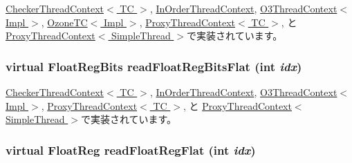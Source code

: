 \hyperlink{classCheckerThreadContext_a4998e6615f835676762af364eff198e3}{CheckerThreadContext$<$ TC $>$}, \hyperlink{classInOrderThreadContext_a4998e6615f835676762af364eff198e3}{InOrderThreadContext}, \hyperlink{classO3ThreadContext_a16de1015632e110ed029afa05ffd799d}{O3ThreadContext$<$ Impl $>$}, \hyperlink{classOzoneCPU_1_1OzoneTC_a0d251dc1da1814673c7548cf46caf6ca}{OzoneTC$<$ Impl $>$}, \hyperlink{classProxyThreadContext_a4998e6615f835676762af364eff198e3}{ProxyThreadContext$<$ TC $>$}, と \hyperlink{classProxyThreadContext_a4998e6615f835676762af364eff198e3}{ProxyThreadContext$<$ SimpleThread $>$}で実装されています。\hypertarget{classThreadContext_a3715f0deff5e4aeb64a8cf3ca293068b}{
\subsubsection[{readFloatRegBitsFlat}]{\setlength{\rightskip}{0pt plus 5cm}virtual {\bf FloatRegBits} readFloatRegBitsFlat (int {\em idx})}}
\label{classThreadContext_a3715f0deff5e4aeb64a8cf3ca293068b}


\hyperlink{classCheckerThreadContext_a2fa29585c9694c9bffcce2a63f871759}{CheckerThreadContext$<$ TC $>$}, \hyperlink{classInOrderThreadContext_a2fa29585c9694c9bffcce2a63f871759}{InOrderThreadContext}, \hyperlink{classO3ThreadContext_a86d029a01b9faaab8b1480cd407528e6}{O3ThreadContext$<$ Impl $>$}, \hyperlink{classProxyThreadContext_a2fa29585c9694c9bffcce2a63f871759}{ProxyThreadContext$<$ TC $>$}, と \hyperlink{classProxyThreadContext_a2fa29585c9694c9bffcce2a63f871759}{ProxyThreadContext$<$ SimpleThread $>$}で実装されています。\hypertarget{classThreadContext_a275e2481d9069a0ae8142fb7cc901cbf}{
\subsubsection[{readFloatRegFlat}]{\setlength{\rightskip}{0pt plus 5cm}virtual {\bf FloatReg} readFloatRegFlat (int {\em idx})}}
\label{classThreadContext_a275e2481d9069a0ae8142fb7cc901cbf}


